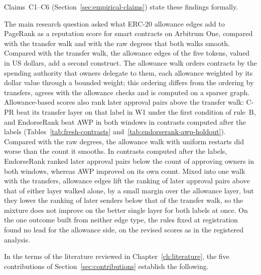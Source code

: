 Claims~C1--C6 (Section~\ref{sec:empirical-claims}) state these findings formally.

The main research question asked what ERC-20 allowance edges add to PageRank as a reputation score for smart contracts on Arbitrum One, compared with the transfer walk and with the raw degrees that both walks smooth. Compared with the transfer walk, the allowance edges of the five tokens, valued in US dollars, add a second construct. The allowance walk orders contracts by the spending authority that owners delegate to them, each allowance weighted by its dollar value through a bounded weight; this ordering differs from the ordering by transfers, agrees with the allowance checks and is computed on a sparser graph. Allowance-based scores also rank later approval pairs above the transfer walk: C-PR beat its transfer layer on that label in W1 under the first condition of rule~B, and EndorseRank beat AWP in both windows in contrasts computed after the labels (Tables~\ref{tab:fresh-contrasts} and~\ref{tab:endorserank-awp-holdout}). Compared with the raw degrees, the allowance walk with uniform restarts did worse than the count it smooths. In contrasts computed after the labels, EndorseRank ranked later approval pairs below the count of approving owners in both windows, whereas AWP improved on its own count. Mixed into one walk with the transfers, allowance edges lift the ranking of later approval pairs above that of either layer walked alone, by a small margin over the allowance layer, but they lower the ranking of later senders below that of the transfer walk, so the mixture does not improve on the better single layer for both labels at once. On the one outcome built from neither edge type, the rules fixed at registration found no lead for the allowance side, on the revised scores as in the registered analysis.


In the terms of the literature reviewed in Chapter~\ref{ch:literature}, the five contributions of Section~\ref{sec:contributions} establish the following.

